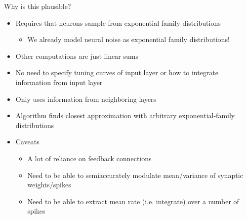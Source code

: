 \documentclass{beamer}
\begin{document}
\begin{frame}{Why is this plausible?}
  \begin{itemize}
  \item
  	Requires that neurons sample from exponential family distributions
	\begin{itemize}
  	\item
  		We already model neural noise as exponential family distributions!
	\end{itemize}
  \item
  	Other computations are just linear sums
  \item
  	No need to specify tuning curves of input layer or how to integrate information from input layer
  \item
  	Only uses information from neighboring layers
  \item
  	Algorithm finds closest approximation with arbitrary exponential-family distributions
  \item
  	Caveats
	 \begin{itemize}
	 \item
	 	A lot of reliance on feedback connections
	\item
		Need to be able to semiaccurately modulate mean/variance of synaptic weights/spikes
	\item
		Need to be able to extract mean rate (i.e. integrate) over a number of spikes
  \end{itemize}
  \end{itemize}
\end{frame}
\end{document}
